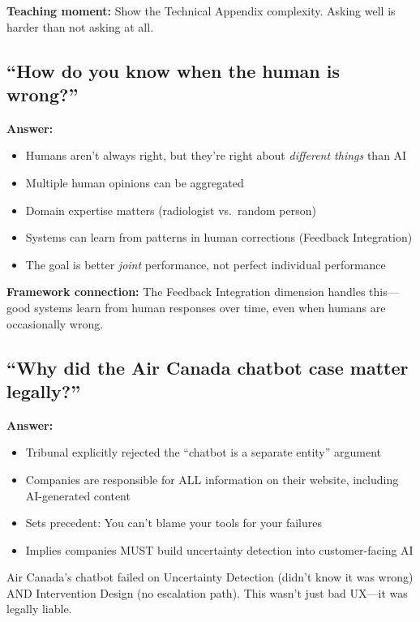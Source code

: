 \textbf{Teaching moment:} Show the Technical Appendix complexity. Asking well is harder than not asking at all.

\subsection{``How do you know when the human is wrong?''}

\textbf{Answer:}
\begin{itemize}
    \item Humans aren't always right, but they're right about \emph{different things} than AI
    \item Multiple human opinions can be aggregated
    \item Domain expertise matters (radiologist vs.\ random person)
    \item Systems can learn from patterns in human corrections (Feedback Integration)
    \item The goal is better \emph{joint} performance, not perfect individual performance
\end{itemize}

\textbf{Framework connection:} The Feedback Integration dimension handles this---good systems learn from human responses over time, even when humans are occasionally wrong.

\subsection{``Why did the Air Canada chatbot case matter legally?''}

\textbf{Answer:}
\begin{itemize}
    \item Tribunal explicitly rejected the ``chatbot is a separate entity'' argument
    \item Companies are responsible for ALL information on their website, including AI-generated content
    \item Sets precedent: You can't blame your tools for your failures
    \item Implies companies MUST build uncertainty detection into customer-facing AI
\end{itemize}

\begin{cautionbox}
Air Canada's chatbot failed on Uncertainty Detection (didn't know it was wrong) AND Intervention Design (no escalation path). This wasn't just bad UX---it was legally liable.
\end{cautionbox}

